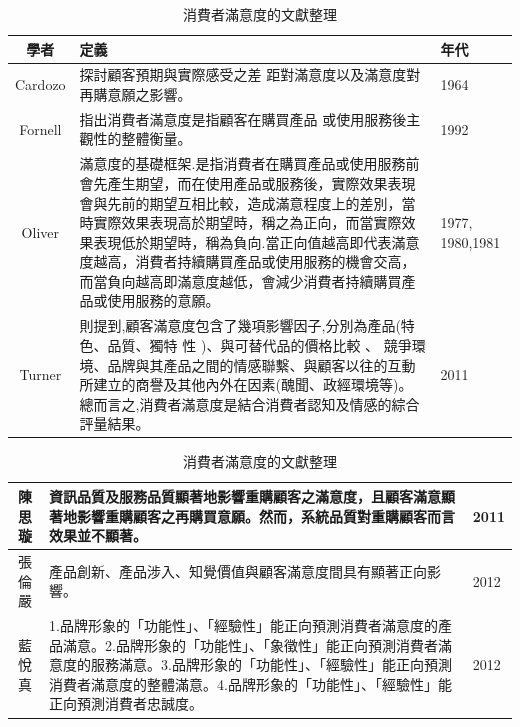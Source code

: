 \begin{table}[htb]
\caption{消費者滿意度的文獻整理}
\label{tab:PL4}
\centering
%
\begin{tabular}[t]{|c|p{8.5cm}|p{2.5cm}|} %
\hline
學者&定義 & 年代 \tabularnewline
\hline
 Cardozo & 探討顧客預期與實際感受之差 距對滿意度以及滿意度對再購意願之影響。& 1964  \tabularnewline
\hline
Fornell&指出消費者滿意度是指顧客在購買產品 或使用服務後主觀性的整體衡量。& 1992 \tabularnewline
\hline
Oliver &滿意度的基礎框架.是指消費者在購買產品或使用服務前會先產生期望，而在使用產品或服務後，實際效果表現會與先前的期望互相比較，造成滿意程度上的差別，當時實際效果表現高於期望時，稱之為正向，而當實際效果表現低於期望時，稱為負向.當正向值越高即代表滿意度越高，消費者持續購買產品或使用服務的機會交高，而當負向越高即滿意度越低，會減少消費者持續購買產品或使用服務的意願。&1977, 1980,1981\tabularnewline
\hline
Turner&則提到,顧客滿意度包含了幾項影響因子,分別為產品(特色、品質、獨特 性 )、與可替代品的價格比較 、 競爭環境、品牌與其產品之間的情感聯繫、與顧客以往的互動所建立的商譽及其他內外在因素(醜聞、政經環境等)。總而言之,消費者滿意度是結合消費者認知及情感的綜合評量結果。&2011 \tabularnewline
\hline
\end{tabular}
\end{table}


\begin{table}[htb]
\caption{消費者滿意度的文獻整理}
\label{tab:PL5}
\centering
%
\begin{tabular}[t]{|c|p{8.5cm}|p{2.5cm}|} %
\hline
陳思璇&資訊品質及服務品質顯著地影響重購顧客之滿意度，且顧客滿意顯著地影響重購顧客之再購買意願。然而，系統品質對重購顧客而言效果並不顯著。&2011 \tabularnewline
\hline
張倫嚴&產品創新、產品涉入、知覺價值與顧客滿意度間具有顯著正向影響。&2012
\tabularnewline
\hline
藍悅真&1.品牌形象的「功能性」、「經驗性」能正向預測消費者滿意度的產品滿意。2.品牌形象的「功能性」、「象徵性」能正向預測消費者滿意度的服務滿意。3.品牌形象的「功能性」、「經驗性」能正向預測消費者滿意度的整體滿意。4.品牌形象的「功能性」、「經驗性」能正向預測消費者忠誠度。&2012
\tabularnewline
\hline
\end{tabular}
\end{table}

